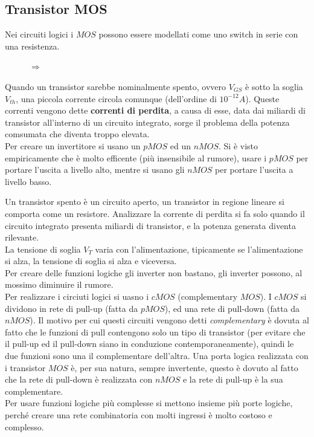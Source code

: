 \documentclass[12pt]{article}
\begin{document}
\subsection{Transistor MOS}
Nei circuiti logici i $MOS$ possono essere modellati come uno switch in serie con una resistenza.
\begin{figure}[H]
    \centering
    \qquad
    $\Rightarrow$
    \qquad
\end{figure}

Quando un transistor sarebbe nominalmente spento, ovvero $V_{GS}$ \`e sotto la soglia $V_{th}$, una piccola corrente circola comunque (dell'ordine di $10^{-12}A$). Queste correnti vengono dette \textbf{correnti di perdita}, a causa di esse, data dai miliardi di transistor all'interno di un circuito integrato, sorge il problema della potenza comsumata che diventa troppo elevata. \\
Per creare un invertitore si usano un $pMOS$ ed un $nMOS$. Si \`e visto empiricamente che \`e molto efficente (pi\`u insensibile al rumore), usare i $pMOS$ per portare l'uscita a livello alto, mentre si usano gli $nMOS$ per portare l'uscita a livello basso. 

Un transistor spento \`e un circuito aperto, un transistor in regione lineare si comporta come un resistore. Analizzare la corrente di perdita si fa solo quando il circuito integrato presenta miliardi di transistor, e la potenza generata diventa rilevante. \\
La tensione di soglia $V_T$ varia con l'alimentazione, tipicamente se l'alimentazione si alza, la tensione di soglia si alza e viceversa. \\
Per creare delle funzioni logiche gli inverter non bastano, gli inverter possono, al mossimo diminuire il rumore. \\
Per realizzare i circiuti logici si uasno i $cMOS$ (complementary $MOS$). I $cMOS$ si dividono in rete di pull-up (fatta da $pMOS$), ed una rete di pull-down (fatta da $nMOS$). Il motivo per cui questi circuiti vengono detti \emph{complementary} \`e dovuta al fatto che le funzioni di pull contengono solo un tipo di transistor (per evitare che il pull-up ed il pull-down siano in conduzione contemporaneamente), quindi le due funzioni sono una il complementare dell'altra. Una porta logica realizzata con i transistor $MOS$ \`e, per sua natura, sempre invertente, questo \`e dovuto al fatto che la rete di pull-down \`e realizzata con $nMOS$ e la rete di pull-up \`e la sua complementare. \\
Per usare funzioni logiche pi\`u complesse si mettono insieme pi\`u porte logiche, perch\'e creare una rete combinatoria con molti ingressi \`e molto costoso e complesso. 
\end{document}
